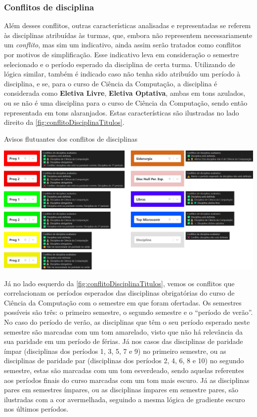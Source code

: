 \subsubsection*{Conflitos de disciplina} \label{sssec:Disciplina}

Além desses conflitos, outras características analisadas e representadas se referem às disciplinas atribuídas às turmas, que, embora não representem necessariamente um \textit{conflito}, mas sim um indicativo, ainda assim serão tratados como conflitos por motivos de simplificação. Esse indicativo leva em consideração o semestre selecionado e o período esperado da disciplina de certa turma. Utilizando de lógica similar, também é indicado caso não tenha sido atribuído um período à disciplina, e se, para o curso de Ciência da Computação, a disciplina é considerada como \textbf{Eletiva Livre}, \textbf{Eletiva Optativa}, ambas em tons azulados, ou se não é uma disciplina para o curso de Ciência da Computação, sendo então representada em tons alaranjados. Estas características são ilustradas no lado direito da \autoref{fig:conflitoDisciplinaTitulos}.

\begin{MyCenteredFigure} \caption{Avisos flutuantes dos conflitos de disciplinas} \label{fig:conflitoDisciplinaTitulos}
  \includegraphics[width=\textwidth]{files/img/2.02!5-desenvolvimento/2.02!5.1.5-conflitos/Categorias Disciplinas}
\end{MyCenteredFigure}

Já no lado esquerdo da \autoref{fig:conflitoDisciplinaTitulos}, vemos os conflitos que correlacionam os períodos esperados das disciplinas obrigatórias do curso de Ciência da Computação com o semestre em que foram ofertadas. Os semestres possíveis são três: o primeiro semestre, o segundo semestre e o ``período de verão''. No caso do período de verão, as disciplinas que têm o seu período esperado neste semestre são marcadas com um tom amarelado, visto que não há relevância da sua paridade em um período de férias. Já nos casos das disciplinas de paridade ímpar (disciplinas dos períodos 1, 3, 5, 7 e 9) no primeiro semestre, ou as disciplinas de paridade par (disciplinas dos períodos 2, 4, 6, 8 e 10) no segundo semestre, estas são marcadas com um tom esverdeado, sendo aquelas referentes aos períodos finais do curso marcadas com um tom mais escuro. Já as disciplinas pares em semestres ímpares, ou as disciplinas ímpares em semestre pares, são ilustradas com a cor avermelhada, seguindo a mesma lógica de gradiente escuro nos últimos períodos.

